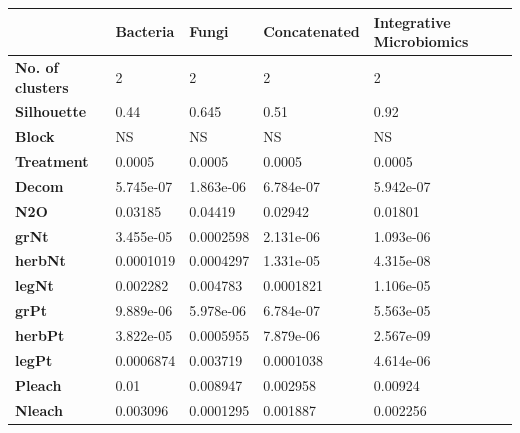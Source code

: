 \begin{table}[H]
	\begin{tabular}{|l|l|l|l|l|}
		\hline
		& \textbf{Bacteria} & \textbf{Fungi} & \textbf{Concatenated} & \textbf{Integrative Microbiomics} \\ \hline
		\textbf{No. of clusters} & 2                 & 2              & 2                     & 2                                 \\ \hline
		\textbf{Silhouette}      & 0.44              & 0.645          & 0.51                  & 0.92                              \\ \hline
		\textbf{Block}           & NS                & NS             & NS                    & NS                                \\ \hline
		\textbf{Treatment}       & 0.0005            & 0.0005         & 0.0005                & 0.0005                            \\ \hline
		\textbf{Decom}           & 5.745e-07         & 1.863e-06      & 6.784e-07             & 5.942e-07                         \\ \hline
		\textbf{N2O}             & 0.03185           & 0.04419        & 0.02942               & 0.01801                           \\ \hline
		\textbf{grNt}            & 3.455e-05         & 0.0002598      & 2.131e-06             & 1.093e-06                         \\ \hline
		\textbf{herbNt}          & 0.0001019         & 0.0004297      & 1.331e-05             & 4.315e-08                         \\ \hline
		\textbf{legNt}           & 0.002282          & 0.004783       & 0.0001821             & 1.106e-05                         \\ \hline
		\textbf{grPt}            & 9.889e-06         & 5.978e-06      & 6.784e-07             & 5.563e-05                         \\ \hline
		\textbf{herbPt}          & 3.822e-05         & 0.0005955      & 7.879e-06             & 2.567e-09                         \\ \hline
		\textbf{legPt}           & 0.0006874         & 0.003719       & 0.0001038             & 4.614e-06                         \\ \hline
		\textbf{Pleach}          & 0.01              & 0.008947       & 0.002958              & 0.00924                           \\ \hline
		\textbf{Nleach}          & 0.003096          & 0.0001295      & 0.001887              & 0.002256                          \\ \hline

\end{tabular}
\end{table}
